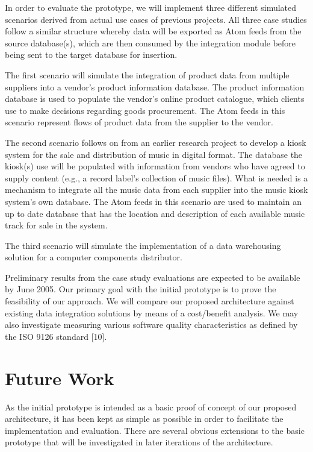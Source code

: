 \documentclass{CRPITStyle}
\begin{document}
In order to evaluate the prototype, we will implement three different
simulated scenarios derived from actual use cases of previous projects.
All three case studies follow a similar structure whereby data will be
exported as Atom feeds from the source database(s), which are then
consumed by the integration module before being sent to the target
database for insertion.

The first scenario will simulate the integration of product data from
multiple suppliers into a vendor's product information database. The
product information database is used to populate the vendor's online
product catalogue, which clients use to make decisions regarding goods
procurement. The Atom feeds in this scenario represent flows of product
data from the supplier to the vendor.

The second scenario follows on from an earlier research project to
develop a kiosk system for the sale and distribution of music in digital
format. The database the kiosk(s) use will be populated with information
from vendors who have agreed to supply content (e.g., a record label's
collection of music files). What is needed is a mechanism to integrate
all the music data from each supplier into the music kiosk system's own
database. The Atom feeds in this scenario are used to maintain an up to
date database that has the location and description of each available
music track for sale in the system.

The third scenario will simulate the implementation of a data
warehousing solution for a computer components distributor.

Preliminary results from the case study evaluations are expected to be
available by June 2005. Our primary goal with the initial prototype is
to prove the feasibility of our approach. We will compare our proposed
architecture against existing data integration solutions by means of a
cost/benefit analysis. We may also investigate measuring various
software quality characteristics as defined by the ISO 9126 standard
[10].


\section{Future Work}

As the initial prototype is intended as a basic proof of concept of our
proposed architecture, it has been kept as simple as possible in order
to facilitate the implementation and evaluation. There are several
obvious extensions to the basic prototype that will be investigated in
later iterations of the architecture.
\end{document}
